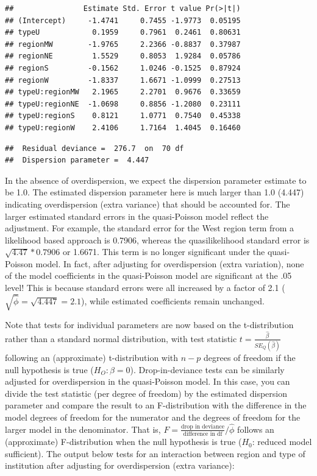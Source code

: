 \documentclass[
]{krantz}
\begin{document}
\begin{verbatim}
##                Estimate Std. Error t value Pr(>|t|)
## (Intercept)     -1.4741     0.7455 -1.9773  0.05195
## typeU            0.1959     0.7961  0.2461  0.80631
## regionMW        -1.9765     2.2366 -0.8837  0.37987
## regionNE         1.5529     0.8053  1.9284  0.05786
## regionS         -0.1562     1.0246 -0.1525  0.87924
## regionW         -1.8337     1.6671 -1.0999  0.27513
## typeU:regionMW   2.1965     2.2701  0.9676  0.33659
## typeU:regionNE  -1.0698     0.8856 -1.2080  0.23111
## typeU:regionS    0.8121     1.0771  0.7540  0.45338
## typeU:regionW    2.4106     1.7164  1.4045  0.16460
\end{verbatim}

\begin{verbatim}
##  Residual deviance =  276.7  on  70 df 
##  Dispersion parameter =  4.447
\end{verbatim}

In the absence of overdispersion, we expect the dispersion parameter estimate to be 1.0. The estimated dispersion parameter here is much larger than 1.0 (4.447) indicating overdispersion (extra variance) that should be accounted for. The larger estimated standard errors in the quasi-Poisson model reflect the adjustment. For example, the standard error for the West region term from a likelihood based approach is 0.7906, whereas the quasilikelihood standard error is \(\sqrt{4.47}*0.7906\) or 1.6671. This term is no longer significant under the quasi-Poisson model. In fact, after adjusting for overdispersion (extra variation), none of the model coefficients in the quasi-Poisson model are significant at the .05 level! This is because standard errors were all increased by a factor of 2.1 (\(\sqrt{\hat\phi}=\sqrt{4.447}=2.1\)), while estimated coefficients remain unchanged.

Note that tests for individual parameters are now based on the t-distribution rather than a standard normal distribution, with test statistic \(t=\frac{\hat\beta}{SE_Q(\hat\beta)}\) following an (approximate) t-distribution with \(n-p\) degrees of freedom if the null hypothesis is true (\(H_O:\beta=0\)). Drop-in-deviance tests can be similarly adjusted for overdispersion in the quasi-Poisson model. In this case, you can divide the test statistic (per degree of freedom) by the estimated dispersion parameter and compare the result to an F-distribution with the difference in the model degrees of freedom for the numerator and the degrees of freedom for the larger model in the denominator. That is, \(F=\frac{\textrm{drop in deviance}}{\textrm{difference in df}} / {\hat\phi}\) follows an (approximate) F-distribution when the null hypothesis is true (\(H_0\): reduced model sufficient). The output below tests for an interaction between region and type of institution after adjusting for overdispersion (extra variance):
\end{document}
